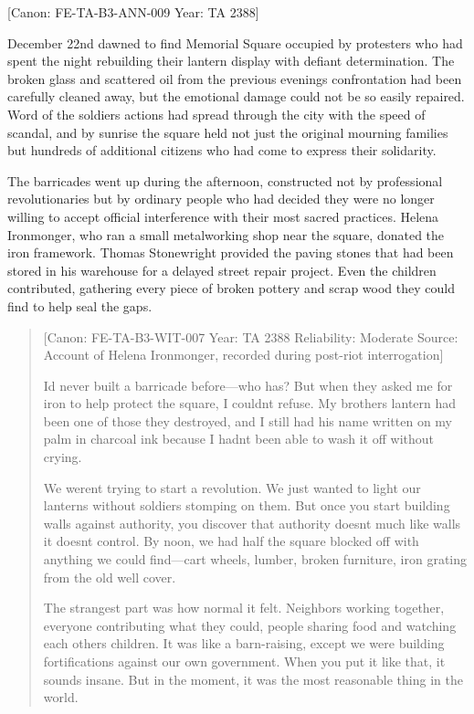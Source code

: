 {[}Canon: FE-TA-B3-ANN-009 \textbar{} Year: TA 2388{]}

December 22nd dawned to find Memorial Square occupied by protesters who
had spent the night rebuilding their lantern display with defiant
determination. The broken glass and scattered oil from the previous
evening\textquotesingle s confrontation had been carefully cleaned away,
but the emotional damage could not be so easily repaired. Word of the
soldiers\textquotesingle{} actions had spread through the city with the
speed of scandal, and by sunrise the square held not just the original
mourning families but hundreds of additional citizens who had come to
express their solidarity.

The barricades went up during the afternoon, constructed not by
professional revolutionaries but by ordinary people who had decided they
were no longer willing to accept official interference with their most
sacred practices. Helena Ironmonger, who ran a small metalworking shop
near the square, donated the iron framework. Thomas Stonewright provided
the paving stones that had been stored in his warehouse for a delayed
street repair project. Even the children contributed, gathering every
piece of broken pottery and scrap wood they could find to help seal the
gaps.

\begin{quote}
{[}Canon: FE-TA-B3-WIT-007 \textbar{} Year: TA 2388 \textbar{}
Reliability: Moderate \textbar{} Source: Account of Helena Ironmonger,
recorded during post-riot interrogation{]}

I\textquotesingle d never built a barricade before---who has? But when
they asked me for iron to help protect the square, I
couldn\textquotesingle t refuse. My brother\textquotesingle s lantern
had been one of those they destroyed, and I still had his name written
on my palm in charcoal ink because I hadn\textquotesingle t been able to
wash it off without crying.

We weren\textquotesingle t trying to start a revolution. We just wanted
to light our lanterns without soldiers stomping on them. But once you
start building walls against authority, you discover that authority
doesn\textquotesingle t much like walls it doesn\textquotesingle t
control. By noon, we had half the square blocked off with anything we
could find---cart wheels, lumber, broken furniture, iron grating from
the old well cover.

The strangest part was how normal it felt. Neighbors working together,
everyone contributing what they could, people sharing food and watching
each other\textquotesingle s children. It was like a barn-raising,
except we were building fortifications against our own government. When
you put it like that, it sounds insane. But in the moment, it was the
most reasonable thing in the world.
\end{quote}

